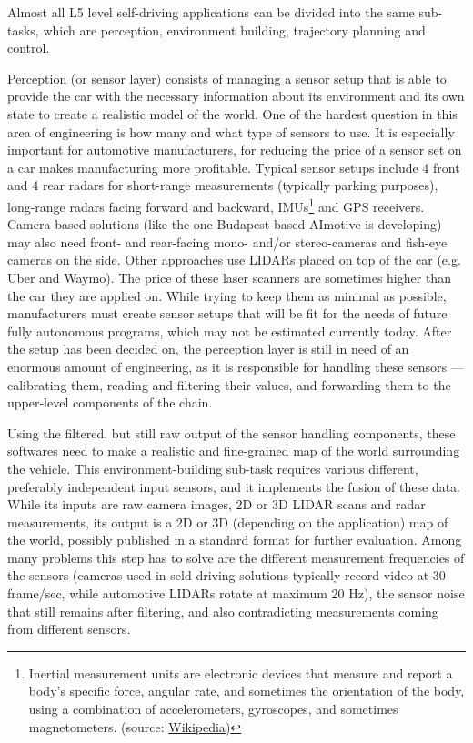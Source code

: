 Almost all L5 level self-driving applications can be divided into the same sub-tasks, which are perception, environment building, trajectory planning and control.

Perception (or sensor layer) consists of managing a sensor setup that is able to provide the car with the necessary information about its environment and its own state to create a realistic model of the world. One of the hardest question in this area of engineering is how many and what type of sensors to use. It is especially important for automotive manufacturers, for reducing the price of a sensor set on a car makes manufacturing more profitable. Typical sensor setups include 4 front and 4 rear radars for short-range measurements (typically parking purposes), long-range radars facing forward and backward, IMUs\footnote{Inertial measurement units are electronic devices that measure and report a body's specific force, angular rate, and sometimes the orientation of the body, using a combination of accelerometers, gyroscopes, and sometimes magnetometers. (source: \href{https://en.wikipedia.org/wiki/Inertial_measurement_unit}{Wikipedia})} and GPS receivers. Camera-based solutions (like the one Budapest-based AImotive is developing) may also need front- and rear-facing mono- and/or stereo-cameras and fish-eye cameras on the side. Other approaches use LIDARs placed on top of the car (e.g. Uber and Waymo). The price of these laser scanners are sometimes higher than the car they are applied on. While trying to keep them as minimal as possible, manufacturers must create sensor setups that will be fit for the needs of future fully autonomous programs, which may not be estimated currently today. After the setup has been decided on, the perception layer is still in need of an enormous amount of engineering, as it is responsible for handling these sensors --- calibrating them, reading and filtering their values, and forwarding them to the upper-level components of the chain.

Using the filtered, but still raw output of the sensor handling components, these softwares need to make a realistic and fine-grained map of the world surrounding the vehicle. This environment-building sub-task requires various different, preferably independent input sensors, and it implements the fusion of these data. While its inputs are raw camera images, 2D or 3D LIDAR scans and radar measurements, its output is a 2D or 3D (depending on the application) map of the world, possibly published in a standard format for further evaluation. Among many problems this step has to solve are the different measurement frequencies of the sensors (cameras used in seld-driving solutions typically record video at 30 frame/sec, while automotive LIDARs rotate at maximum 20 Hz), the sensor noise that still remains after filtering, and also contradicting measurements coming from different sensors.

